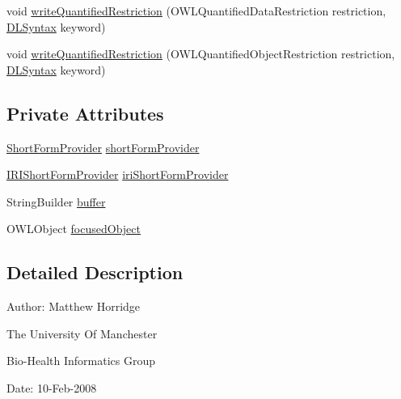 \begin{DoxyCompactItemize}
\item 
void \hyperlink{classuk_1_1ac_1_1manchester_1_1cs_1_1owlapi_1_1dlsyntax_1_1_d_l_syntax_object_renderer_a509a5f6bb08114db38d9a2bf02522b07}{write\-Quantified\-Restriction} (O\-W\-L\-Quantified\-Data\-Restriction restriction, \hyperlink{enumuk_1_1ac_1_1manchester_1_1cs_1_1owlapi_1_1dlsyntax_1_1_d_l_syntax}{D\-L\-Syntax} keyword)
\item 
void \hyperlink{classuk_1_1ac_1_1manchester_1_1cs_1_1owlapi_1_1dlsyntax_1_1_d_l_syntax_object_renderer_a3f114b7eda351653127b73f745039fa3}{write\-Quantified\-Restriction} (O\-W\-L\-Quantified\-Object\-Restriction restriction, \hyperlink{enumuk_1_1ac_1_1manchester_1_1cs_1_1owlapi_1_1dlsyntax_1_1_d_l_syntax}{D\-L\-Syntax} keyword)
\end{DoxyCompactItemize}
\subsection*{Private Attributes}
\begin{DoxyCompactItemize}
\item 
\hyperlink{interfaceorg_1_1semanticweb_1_1owlapi_1_1util_1_1_short_form_provider}{Short\-Form\-Provider} \hyperlink{classuk_1_1ac_1_1manchester_1_1cs_1_1owlapi_1_1dlsyntax_1_1_d_l_syntax_object_renderer_a6f46cca6324fcd9d0201342f672bc760}{short\-Form\-Provider}
\item 
\hyperlink{interfaceorg_1_1semanticweb_1_1owlapi_1_1util_1_1_i_r_i_short_form_provider}{I\-R\-I\-Short\-Form\-Provider} \hyperlink{classuk_1_1ac_1_1manchester_1_1cs_1_1owlapi_1_1dlsyntax_1_1_d_l_syntax_object_renderer_a87c4535e1f7dbcb9d80c4fe3fe24209e}{iri\-Short\-Form\-Provider}
\item 
String\-Builder \hyperlink{classuk_1_1ac_1_1manchester_1_1cs_1_1owlapi_1_1dlsyntax_1_1_d_l_syntax_object_renderer_ac136f4bfc9257e4f3052c782d7a34244}{buffer}
\item 
O\-W\-L\-Object \hyperlink{classuk_1_1ac_1_1manchester_1_1cs_1_1owlapi_1_1dlsyntax_1_1_d_l_syntax_object_renderer_af8e0c40164f96606b42bea3fa1bcf4e7}{focused\-Object}
\end{DoxyCompactItemize}


\subsection{Detailed Description}
Author\-: Matthew Horridge\par
 The University Of Manchester\par
 Bio-\/\-Health Informatics Group\par
 Date\-: 10-\/\-Feb-\/2008\par
\par
 


